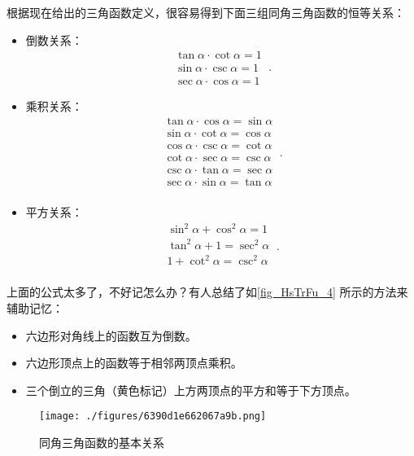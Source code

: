 根据现在给出的三角函数定义，很容易得到下面三组同角三角函数的恒等关系：
\begin{itemize}
\item 倒数关系：
\begin{equation}\label{eq_HsTrFu_1}
\begin{split}
\tan \alpha \cdot \cot \alpha = 1\\
\sin \alpha \cdot  \csc \alpha = 1\\
\sec \alpha  \cdot \cos \alpha = 1
\end{split}~.
\end{equation}
\item 乘积关系：
\begin{equation}\label{eq_HsTrFu_2}
\begin{split}
\tan \alpha \cdot\cos \alpha= \sin \alpha\\
\sin \alpha \cdot\cot \alpha= \cos \alpha\\
\cos \alpha \cdot\csc \alpha= \cot \alpha\\
\cot \alpha \cdot\sec \alpha= \csc \alpha\\
\csc \alpha \cdot\tan \alpha= \sec \alpha\\
\sec \alpha \cdot\sin \alpha= \tan \alpha\\
\end{split}~.
\end{equation}
\item 平方关系：
\begin{equation}\label{eq_HsTrFu_3}
\begin{split}
\sin ^{2} \alpha + \cos ^{2}\alpha =1\\
\tan  ^{2} \alpha + 1 =\sec ^{2}\alpha\\
1 + \cot ^{2}\alpha =\csc ^{2}\alpha\\
\end{split}~.
\end{equation}
\end{itemize}
上面的公式太多了，不好记怎么办？有人总结了如\autoref{fig_HsTrFu_4} 所示的方法来辅助记忆：
\begin{itemize}
\item 六边形对角线上的函数互为倒数。
\item 六边形顶点上的函数等于相邻两顶点乘积。
\item 三个倒立的三角（黄色标记）上方两顶点的平方和等于下方顶点。
\end{itemize}
\begin{figure}[ht]
\centering
\texttt{[image: ./figures/6390d1e662067a9b.png]}
\caption{同角三角函数的基本关系} \label{fig_HsTrFu_4}
\end{figure}

